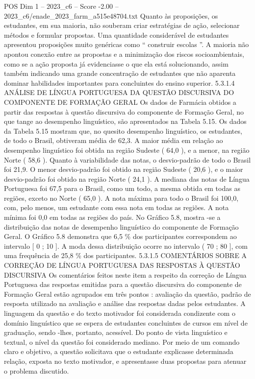 \begin{textsample}{POS Dim 1 – 2023\_c6 – Score -2.00 – 2023\_c6/enade\_2023\_farm\_a515e48704.txt}
Quanto às proposições, os estudantes, em sua maioria, não souberam criar estratégias de ação, selecionar métodos e formular propostas.
Uma quantidade considerável de estudantes apresentou proposições muito genéricas como “ construir escolas ”.
A maioria não apontou conexão entre as propostas e a minimização dos riscos socioambientais, como se a ação proposta já evidenciasse o que ela está solucionando, assim também indicando uma grande concentração de estudantes que não aparenta dominar habilidades importantes para concluintes do ensino superior. 5.3.1.4 ANÁLISE DE LÍNGUA PORTUGUESA DA QUESTÃO DISCURSIVA DO COMPONENTE DE FORMAÇÃO GERAL Os dados de Farmácia obtidos a partir das respostas à questão discursiva do componente de Formação Geral, no que tange ao desempenho linguístico, são apresentados na Tabela 5.15.
Os dados da Tabela 5.15 mostram que, no quesito desempenho linguístico, os estudantes, de todo o Brasil, obtiveram média de 62,3.
A maior média em relação ao desempenho linguístico foi obtida na região Sudeste ( 64,0 ), e a menor, na região Norte ( 58,6 ).
Quanto à variabilidade das notas, o desvio-padrão de todo o Brasil foi 21,9.
O menor desvio-padrão foi obtido na região Sudeste ( 20,6 ), e o maior desvio-padrão foi obtido na região Norte ( 24,1 ).
A mediana das notas de Língua Portuguesa foi 67,5 para o Brasil, como um todo, a mesma obtida em todas as regiões, exceto no Norte ( 65,0 ).
A nota máxima para todo o Brasil foi 100,0, com, pelo menos, um estudante com essa nota em todas as regiões.
A nota mínima foi 0,0 em todas as regiões do país.
No Gráfico 5.8, mostra -se a distribuição das notas de desempenho linguístico do componente de Formação Geral.
O Gráfico 5.8 demonstra que 6,5 \% dos participantes correspondem ao intervalo [ 0 ; 10 ].
A moda dessa distribuição ocorre no intervalo ( 70 ; 80 ], com uma frequência de 25,8 \% dos participantes. 5.3.1.5 COMENTÁRIOS SOBRE A CORREÇÃO DE LÍNGUA PORTUGUESA DAS RESPOSTAS À QUESTÃO DISCURSIVA Os comentários feitos neste item a respeito da correção de Língua Portuguesa das respostas emitidas para a questão discursiva do componente de Formação Geral estão agrupados em três pontos : avaliação da questão, padrão de resposta utilizado na avaliação e análise das respostas dadas pelos estudantes.
A linguagem da questão e do texto motivador foi considerada condizente com o domínio linguístico que se espera de estudantes concluintes de cursos em nível de graduação, sendo -lhes, portanto, acessível.
Do ponto de vista linguístico e textual, o nível da questão foi considerado mediano.
Por meio de um comando claro e objetivo, a questão solicitava que o estudante explicasse determinada relação, exposta no texto motivador, e apresentasse duas propostas para atenuar o problema discutido.

\end{textsample}
